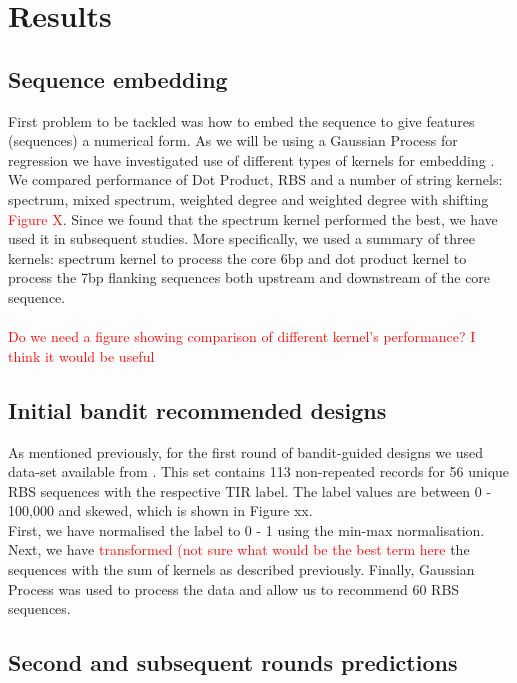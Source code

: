 \documentclass{article}
\begin{document}
\section{Results}

\subsection{Sequence embedding}
First problem to be tackled was how to embed the sequence to give features (sequences) a numerical form. As we will be using a Gaussian Process for regression we have investigated use of different types of kernels for embedding \cite{Ben-Hur2008}. We compared performance of Dot Product, RBS and a number of string kernels: spectrum, mixed spectrum, weighted degree and weighted degree with shifting \textcolor{red}{Figure X}. Since we found that the spectrum kernel performed the best, we have used it in subsequent studies. More specifically, we used a summary of three kernels: spectrum kernel to process the core 6bp and dot product kernel to process the 7bp flanking sequences both upstream and downstream of the core sequence. 
\\
\\
\textcolor{red}{Do we need a figure showing comparison of different kernel's performance? I think it would be useful}

\subsection{Initial bandit recommended designs}
As mentioned previously, for the first round of bandit-guided designs we used data-set available from \textcite{jervis2018machine}. This set contains 113 non-repeated records for 56 unique RBS sequences with the respective TIR label. The label values are between 0 - 100,000 and skewed, which is shown in Figure xx. \\
First, we have normalised the label to 0 - 1 using the min-max normalisation. Next, we have \textcolor{red}{transformed (not sure what would be the best term here} the sequences with the sum of kernels as described previously. Finally, Gaussian Process was used to process the data and allow us to recommend 60 RBS sequences. 


\subsection{Second and subsequent rounds predictions}
\end{document}
